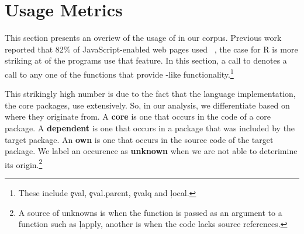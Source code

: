 \documentclass[conference]{IEEEtran}
\begin{document}


\section{Usage Metrics}

This section presents an overiew of the usage of \eval in our corpus.
Previous work reported that 82\% of JavaScript-enabled web pages used
\eval~\cite{ecoop11}, the case for R is more striking at  of the
programs use that feature. In this section, a call to \eval denotes a call
to any one of the functions that provide \eval-like
functionality.\footnote{These include \c{eval}, \c{eval.parent}, \c{evalq}
  and \c{local}.}

This strikingly high number is due to the fact that the language
implementation, the core packages, use \eval extensively. So, in our
analysis, we differentiate \eval based on where they originate from. A {\bf
  core} \eval is one that occurs in the code of a core package.  A {\bf
  dependent} \eval is one that occurs in a package that was included by the
target package. An {\bf own} \eval is one that occurs in the source code of
the target package. We label an \eval occurence as {\bf unknown} when we are
not able to deterimine its origin.\footnote{A source of unknowns is when the
  \eval function is passed as an argument to a function such as \c{lapply},
  another is when the code lacks source references.}
\end{document}
